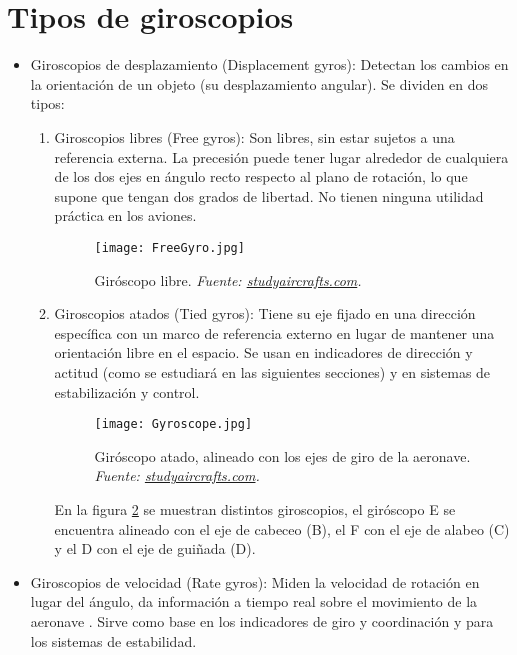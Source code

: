 \section{Tipos de giroscopios}
\begin{itemize}
\item Giroscopios de desplazamiento (Displacement gyros): Detectan los cambios en la orientación de un objeto (su desplazamiento angular). Se dividen en dos tipos:

\begin{enumerate}
\item Giroscopios libres (Free gyros): Son libres, sin estar sujetos a una referencia externa. La precesión puede tener lugar alrededor de cualquiera de los dos ejes en ángulo recto respecto al plano de rotación, lo que supone que tengan dos grados de libertad. No tienen ninguna utilidad práctica en los aviones.

\begin{figure}[H]
    \centering
    \texttt{[image: FreeGyro.jpg]}
    \caption{\centering Giróscopo libre.\textit{ Fuente: \href{https://www.studyaircrafts.com/gyroscopic-instruments}{studyaircrafts.com}.}}
    \label{fig:superprecesionlibre}
\end{figure}

\item Giroscopios atados (Tied gyros): Tiene su eje fijado en una dirección específica con un marco de referencia externo en lugar de mantener una orientación libre en el espacio. Se usan en indicadores de dirección y actitud (como se estudiará en las siguientes secciones) y en sistemas de estabilización y control.

\begin{figure}[H]
    \centering
    \texttt{[image: Gyroscope.jpg]}
    \caption{\centering Giróscopo atado, alineado con los ejes de giro de la aeronave.\textit{ Fuente: \href{https://www.studyaircrafts.com/gyroscopic-instruments}{studyaircrafts.com}.}}
    \label{fig:superprecesionatadaxd}
\end{figure}

En la figura \ref{fig:superprecesionatadaxd} se muestran distintos giroscopios, el giróscopo E se encuentra alineado con el eje de cabeceo (B), el F con el eje de alabeo (C) y el D con el eje de guiñada (D).

\end{enumerate}


\item Giroscopios de velocidad (Rate gyros): Miden la velocidad de rotación en lugar del ángulo, da información a tiempo real sobre el movimiento de la aeronave . Sirve como base en los indicadores de giro y coordinación y para los sistemas de estabilidad.
\end{itemize}

